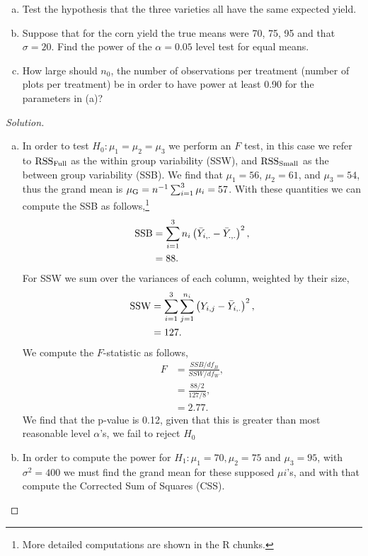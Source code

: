 \documentclass{amsart}\usepackage[]{graphicx}\usepackage[]{color}
\begin{document}
		\begin{enumerate}[(a)]
			\item Test the hypothesis that the three varieties all have the same expected yield.
			\item Suppose that for the corn yield the true means were 70, 75, 95 and that $\sigma = 20$.
			Find the power of the $\alpha = 0.05$ level test for equal means.
			\item How large should $n_{0}$, the number of observations per treatment (number of plots per treatment) be in order to have power at least 0.90 for the parameters in (a)?
		\end{enumerate}
		\begin{proof}[Solution]



		\begin{enumerate}[(a)]
			\item In order to test $H_{0}: \mu_{1} = \mu_{2} = \mu_{3}$ we perform an $F$ test, in this case we refer to $\rm RSS_{Full}$ as the within group variability (SSW), and $\rm RSS_{Small}$ as the between group variability (SSB).
			We find that $\mu_{1} = 56$, $\mu_{2} = 61$, and $\mu_{3} = 54$, thus the grand mean is $\mu_{\rm G} = n^{-1}\sum_{i=1}^{3} \mu_{i} = 57$.
			With these quantities we can compute the SSB as follows,\footnote{More detailed computations are shown in the R chunks.}
				\begin{align*}
					\rm SSB &= \sum\limits_{i=1}^{3} n_{i} \left( \bar{Y}_{i,.} - \bar{Y}_{.,.} \right)^{2}, \\
					&= 88.
				\end{align*}
			For SSW we sum over the variances of each column, weighted by their size,
				\begin{align*}
					\rm SSW &= \sum\limits_{i=1}^{3}\sum\limits_{j=1}^{n_{i}} \left( Y_{i,j} - \bar{Y}_{i,.} \right)^{2}, \\
					&= 127.
				\end{align*}
			We compute the $F$-statistic as follows,
				\begin{align*}
					F &= \frac{SSB/df_{B}}{SSW/df_{W}}, \\
					&= \frac{88/2}{127/8}, \\
					&= 2.77.
				\end{align*}
			We find that the p-value is 0.12, given that this is greater than most reasonable level $\alpha$'s, we fail to reject $H_{0}$
			\item In order to compute the power for $H_{1}: \mu_{1} = 70, \mu_{2} = 75$ and $\mu_{3} = 95$, with $\sigma^{2} = 400$ we must find the grand mean for these supposed $\mu{i}$'s, and with that compute the Corrected Sum of Squares (CSS).

\end{enumerate}
\end{proof}
\end{document}
